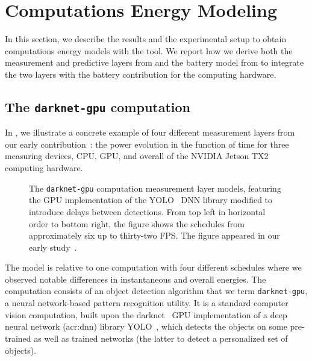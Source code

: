 \section{Computations Energy Modeling}
\label{sec:res-ene-comps}

In this section, we describe the results and the experimental setup to obtain computations energy models with the \powprof{} tool. We report how we derive both the measurement and predictive layers from  and the battery model from  to integrate the two layers with the battery contribution for the computing hardware.

\subsection{The {\tt darknet-gpu} computation}
\label{sec:res-darknet-gpu}

In , we illustrate a concrete example of four different measurement layers from our early contribution~\citep{seewald2019coarse}: the power evolution in the function of time for three measuring devices, CPU, GPU, and overall of the NVIDIA Jetson TX2 computing hardware. 
\begin{figure}[t!]
  \begin{minipage}{.93\textwidth}
  \centering
  \selectfont
  \hspace*{20ex}
  
  \end{minipage}
  \caption[YOLO DNN library detection computation measurement layer models]{The {\tt darknet-gpu} computation measurement layer models, featuring the GPU implementation of the YOLO~\citep{redmon2016you} DNN library modified to introduce delays between detections. From top left in horizontal order to bottom right, the figure shows the schedules from approximately six up to thirty-two FPS. The figure appeared in our early study~\citep{seewald2019coarse}.}
  \label{fig:darknet-layer1}
\end{figure}
The model is relative to one computation with four different schedules where we observed notable differences in instantaneous and overall energies. The computation consists of an object detection algorithm that we term {\small\tt darknet-gpu}, a neural network-based pattern recognition utility. It is a standard computer vision computation, built upon the darknet~\citep{redmond2017yolo,redomnd2013darknet} GPU implementation of a deep neural network (\Gls{acr:dnn}) library YOLO~\citep{redmon2016you}, which detects the objects on some pre-trained as well as trained networks (the latter to detect a personalized set of objects).

